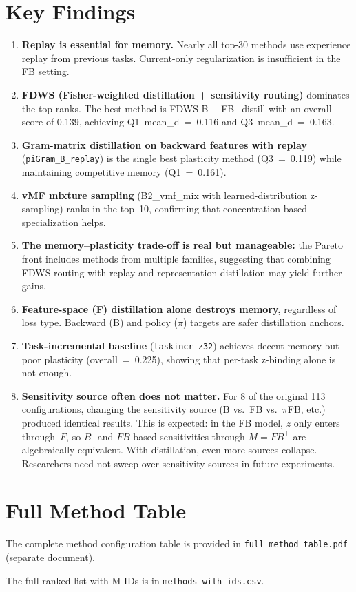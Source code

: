 \documentclass[11pt,a4paper]{article}
\begin{document}
\section{Key Findings}

\begin{enumerate}
  \item \textbf{Replay is essential for memory.}  Nearly all top-30 methods
        use experience replay from previous tasks.  Current-only
        regularization is insufficient in the FB setting.
  \item \textbf{FDWS (Fisher-weighted distillation + sensitivity routing)}
        dominates the top ranks.  The best method is
        FDWS-B$\equiv$FB+distill with an overall score of
        0.139, achieving Q1~mean\_d~=~0.116 and Q3~mean\_d~=~0.163.
  \item \textbf{Gram-matrix distillation on backward features with replay}
        (\texttt{piGram\_B\_replay}) is the single best plasticity method
        (Q3~=~0.119) while maintaining competitive memory (Q1~=~0.161).
  \item \textbf{vMF mixture sampling} (B2\_vmf\_mix with learned-distribution
        z-sampling) ranks in the top~10, confirming that concentration-based
        specialization helps.
  \item \textbf{The memory--plasticity trade-off is real but manageable:}
        the Pareto front includes methods from multiple families, suggesting
        that combining FDWS routing with replay and representation
        distillation may yield further gains.
  \item \textbf{Feature-space (F) distillation alone destroys memory,}
        regardless of loss type.  Backward (B) and policy ($\pi$) targets
        are safer distillation anchors.
  \item \textbf{Task-incremental baseline} (\texttt{taskincr\_z32}) achieves
        decent memory but poor plasticity (overall~=~0.225), showing that
        per-task z-binding alone is not enough.
  \item \textbf{Sensitivity source often does not matter.}
        For 8 of the original 113 configurations, changing the sensitivity
        source (B vs.\ FB vs.\ $\pi$FB, etc.) produced identical results.
        This is expected: in the FB model, $z$ only enters through~$F$, so
        $B$- and $FB$-based sensitivities through $M = F B^\top$ are
        algebraically equivalent.  With distillation, even more sources
        collapse.  Researchers need not sweep over sensitivity sources in
        future experiments.
\end{enumerate}

\appendix
\section{Full Method Table}
The complete method configuration table is provided in
\texttt{full\_method\_table.pdf} (separate document).

The full ranked list with M-IDs is in \texttt{methods\_with\_ids.csv}.
\end{document}
